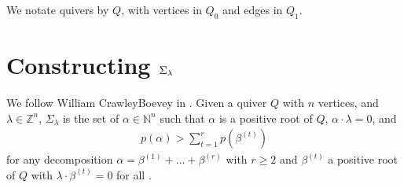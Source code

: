 \documentclass[letterpaper,10pt,english]{sphinxmanual}
\begin{document}
\sphinxAtStartPar
We notate quivers by \(Q\), with vertices in \(Q_0\) and edges in \(Q_1\).


\chapter{Constructing \protect\(\Sigma_{\lambda}\protect\)}
\label{\detokenize{index:constructing-sigma-lambda}}
\sphinxAtStartPar
We follow William Crawley\sphinxhyphen{}Boevey in . Given a quiver \(Q\) with \(n\) vertices, and \({\lambda}\in\mathbb{Z}^n\), \(\Sigma_{\lambda}\) is the set of \(\alpha\in\mathbb{N}^n\) such that \(\alpha\) is a positive root of \(Q\), \(\alpha\cdot\lambda = 0\), and
\begin{equation*}
\begin{split}p(\alpha)>\sum_{t=1}^r p(\beta^{(t)})\end{split}
\end{equation*}
\sphinxAtStartPar
for any decomposition \(\alpha=\beta^{(1)}+\dots+\beta^{(r)}\) with \(r\geq 2\) and \(\beta^{(t)}\) a positive root of \(Q\) with \(\lambda\cdot\beta^{(t)}=0\) for all .
\end{document}
